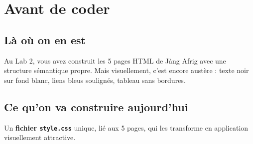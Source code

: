 \documentclass[11pt,a4paper]{article}
\begin{document}
\tableofcontents

\newpage

\section{Avant de coder}

\subsection{Là où on en est}

Au Lab 2, vous avez construit les 5 pages HTML de Jàng Afrig avec une
structure sémantique propre. Mais visuellement, c'est encore austère :
texte noir sur fond blanc, liens bleus soulignés, tableau sans bordures.

\subsection{Ce qu'on va construire aujourd'hui}

Un \textbf{fichier \texttt{style.css}} unique, lié aux 5 pages, qui les
transforme en application visuellement attractive.
\end{document}
